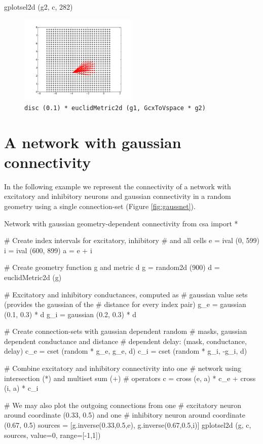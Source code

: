 \documentclass[a4paper,twoside]{report}
\newcommand{\expr}[1]{\lstinline|#1|}
\begin{document}
\begin{code}{}
  gplotsel2d (g2, c, 282)
\end{code}

\begin{figure}
  \begin{center}
    \includegraphics[width=0.5\textwidth]{figures/visualDisc}
    \caption[Random geometry]{\label{fig:visualDisc}
      \expr{disc (0.1) * euclidMetric2d (g1, GcxToVspace * g2)}
    }
  \end{center}
\end{figure}
\clearpage
\pagebreak
\section{A network with gaussian connectivity}
In the following example we represent the connectivity of a network
with excitatory and inhibitory neurons and gaussian connectivity in a
random geometry using a single connection-set (Figure \ref{fig:gaussnet}).

\begin{code}{Network with gaussian geometry-dependent connectivity}
from csa import *

# Create index intervals for excitatory, inhibitory
# and all cells
e = ival (0, 599)
i = ival (600, 899)
a = e + i

# Create geometry function g and metric d
g = random2d (900)
d = euclidMetric2d (g)

# Excitatory and inhibitory conductances, computed as
# gaussian value sets (provides the gaussian of the
# distance for every index pair)
g_e = gaussian (0.1, 0.3) * d
g_i = gaussian (0.2, 0.3) * d

# Create connection-sets with gaussian dependent random
# masks, gaussian dependent conductance and distance
# dependent delay: (mask, conductance, delay)
c_e = cset (random * g_e, g_e, d)
c_i = cset (random * g_i, -g_i, d)

# Combine excitatory and inhibitory connectivity into one
# network using intersection (*) and multiset sum (+)
# operators
c = cross (e, a) * c_e + cross (i, a) * c_i

# We may also plot the outgoing connections from one
# excitatory neuron around coordinate (0.33, 0.5) and one
# inhibitory neuron around coordinate (0.67, 0.5)
sources = [g.inverse(0.33,0.5,e), g.inverse(0.67,0.5,i)]
gplotsel2d (g, c, sources, value=0, range=[-1,1])
\end{code}
\end{document}
